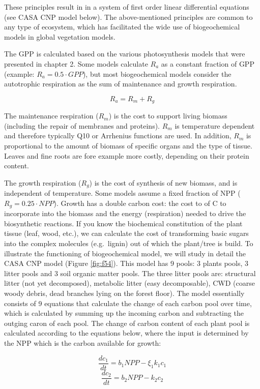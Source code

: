 \documentclass[12pt,oneside]{book}
\begin{document}
These principles result in in a system of first order linear
differential equations (see CASA CNP model below). The above-mentioned
principles are common to any type of ecosystem, which has facilitated
the wide use of biogeochemical models in global vegetation models.

The GPP is calculated based on the various photosynthesis models that
were presented in chapter 2. Some models calculate \(R_a\) as a constant
fraction of GPP (example: \(R_a=0.5 \cdot GPP\)), but most
biogeochemical models consider the autotrophic respiration as the sum of
maintenance and growth respiration.

\[ R_a = R_m + R_g\]

The maintenance respiration (\(R_m\)) is the cost to support living
biomass (including the repair of membranes and proteins). \(R_m\) is
temperature dependent and therefore typically Q10 or Arrhenius functions
are used. In addition, \(R_m\) is proportional to the amount of biomass
of specific organs and the type of tissue. Leaves and fine roots are
fore example more costly, depending on their protein content.

The growth respiration (\(R_g\)) is the cost of synthesis of new
biomass, and is independent of temperature. Some models assume a fixed
fraction of NPP (\(R_g= 0.25 \cdot NPP\)). Growth has a double carbon
cost: the cost to of C to incorporate into the biomass and the energy
(respiration) needed to drive the biosynthetic reactions. If you know
the biochemical constitution of the plant tissue (leaf, wood, etc.), we
can calculate the cost of transforming basic sugars into the complex
molecules (e.g.~lignin) out of which the plant/tree is build. To
illustrate the functioning of biogeochemical model, we will study in
detail the CASA CNP model (Figure \ref{fig:f54}). This model has 9
pools: 3 plants pools, 3 litter pools and 3 soil organic matter pools.
The three litter pools are: structural litter (not yet decomposed),
metabolic litter (easy decomposable), CWD (coarse woody debris, dead
branches lying on the forest floor). The model essentially consists of 9
equations that calculate the change of each carbon pool over time, which
is calculated by summing up the incoming carbon and subtracting the
outging caron of each pool. The change of carbon content of each plant
pool is calculated according to the equations below, where the input is
determined by the NPP which is the carbon available for growth:

\[\frac{dc_1}{dt} = b_1 NPP - \xi_1 k_1 c_1 \]
\[\frac{dc_2}{dt} = b_2 NPP - k_2 c_2 \]
\end{document}
